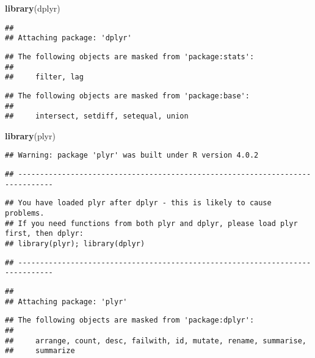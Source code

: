 \documentclass[
]{article}
\newenvironment{Shaded}{\begin{snugshade}}{\end{snugshade}}
\newcommand{\KeywordTok}[1]{\textcolor[rgb]{0.13,0.29,0.53}{\textbf{#1}}}
\newcommand{\NormalTok}[1]{#1}
\begin{document}
\begin{Shaded}
\begin{Highlighting}[]
\KeywordTok{library}\NormalTok{(dplyr)}
\end{Highlighting}
\end{Shaded}

\begin{verbatim}
## 
## Attaching package: 'dplyr'
\end{verbatim}

\begin{verbatim}
## The following objects are masked from 'package:stats':
## 
##     filter, lag
\end{verbatim}

\begin{verbatim}
## The following objects are masked from 'package:base':
## 
##     intersect, setdiff, setequal, union
\end{verbatim}

\begin{Shaded}
\begin{Highlighting}[]
\KeywordTok{library}\NormalTok{(plyr)}
\end{Highlighting}
\end{Shaded}

\begin{verbatim}
## Warning: package 'plyr' was built under R version 4.0.2
\end{verbatim}

\begin{verbatim}
## ------------------------------------------------------------------------------
\end{verbatim}

\begin{verbatim}
## You have loaded plyr after dplyr - this is likely to cause problems.
## If you need functions from both plyr and dplyr, please load plyr first, then dplyr:
## library(plyr); library(dplyr)
\end{verbatim}

\begin{verbatim}
## ------------------------------------------------------------------------------
\end{verbatim}

\begin{verbatim}
## 
## Attaching package: 'plyr'
\end{verbatim}

\begin{verbatim}
## The following objects are masked from 'package:dplyr':
## 
##     arrange, count, desc, failwith, id, mutate, rename, summarise,
##     summarize
\end{verbatim}
\end{document}
